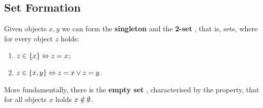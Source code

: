 \documentclass[12pt]{book}
\begin{document}
\subsection{Set Formation}
\label{sec:setformation}

Given objects $x, y$ we can form the \textbf{singleton}  and the \textbf{2-set} , that is, sets, where for every object $z$ holds:
\begin{enumerate}
      \item $z \in \{ x \} \Leftrightarrow z = x$;
      \item $z \in \{ x,y \} \Leftrightarrow z = x \vee z = y$.
\end{enumerate}

More fundamentally, there is the \textbf{empty set} \bmm{\es}, characterised by the property, that for all objects $x$ holds $x \notin \emptyset$.
\end{document}
